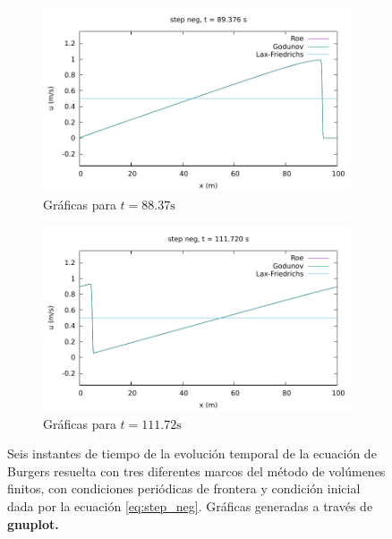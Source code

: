 \documentclass[12pt]{article}
\begin{document}
\begin{figure}[h!]
\begin{subfigure}{0.49\textwidth}
			\includegraphics[width=\textwidth]{../burgers1DVF/results/sol_periodicas/step_neg/084.pdf}
			\caption*{Gráficas para $t=88.37\unit{\second}$}
			\label{fig:step_neg-perio5}
		\end{subfigure}\hfill
		\begin{subfigure}{0.49\textwidth}
			\centering
			\includegraphics[width=\textwidth]{../burgers1DVF/results/sol_periodicas/step_neg/105.pdf}
			\caption*{Gráficas para $t=111.72\unit{\second}$}
			\label{fig:step_neg-perio6}
		\end{subfigure}
		\caption{Seis instantes de tiempo de la evolución temporal de  la ecuación de Burgers resuelta con tres diferentes marcos del método de volúmenes finitos, con condiciones periódicas de frontera y condición inicial dada por la ecuación \ref{eq:step_neg}. Gráficas generadas a través de \textbf{gnuplot.}}
		\label{fig:step_neg-periodica}
	\end{figure}
\end{document}
